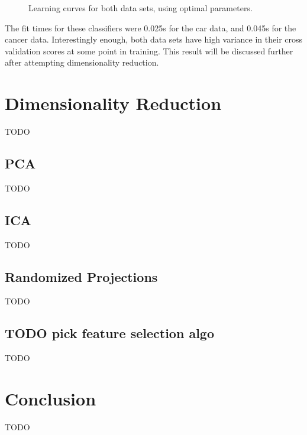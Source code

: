 \documentclass{article}
\begin{document}
\begin{figure}[htb]
        \caption{Learning curves for both data sets, using optimal parameters.}
        \label{fig:em-learning}
        \end{figure}

        The fit times for these classifiers were 0.025s for the car data, and 0.045s for the cancer data. Interestingly enough, both data sets have high variance in their cross validation scores at some point in training. This result will be discussed further after attempting dimensionality reduction.

  \section{Dimensionality Reduction}
    TODO

    \subsection{PCA}
      TODO

    \subsection{ICA}
      TODO

    \subsection{Randomized Projections}
      TODO

    \subsection{TODO pick feature selection algo}
      TODO

  \section{Conclusion}
    TODO
\end{document}
